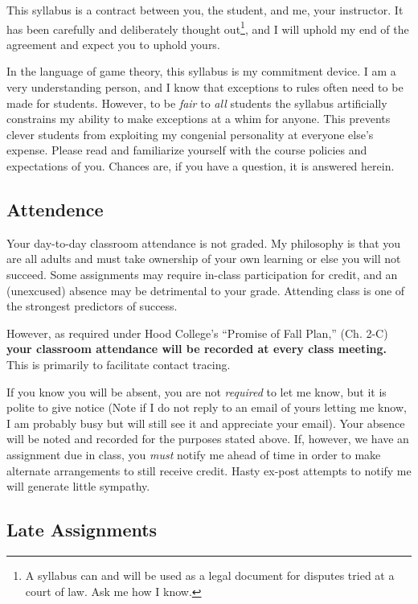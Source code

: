 \documentclass{article}
\begin{document}
This syllabus is a contract between you, the student, and me, your
instructor. It has been carefully and deliberately thought
out\footnote{A syllabus can and will be used as a legal document for
  disputes tried at a court of law. Ask me how I know.}, and I will
uphold my end of the agreement and expect you to uphold yours.

In the language of game theory, this syllabus is my commitment device. I
am a very understanding person, and I know that exceptions to rules
often need to be made for students. However, to be \emph{fair} to
\emph{all} students the syllabus artificially constrains my ability to
make exceptions at a whim for anyone. This prevents clever students from
exploiting my congenial personality at everyone else's expense. Please
read and familiarize yourself with the course policies and expectations
of you. Chances are, if you have a question, it is answered herein.

\hypertarget{attendence}{%
\subsection{Attendence}\label{attendence}}

Your day-to-day classroom attendance is not graded. My philosophy is
that you are all adults and must take ownership of your own learning or
else you will not succeed. Some assignments may require in-class
participation for credit, and an (unexcused) absence may be detrimental
to your grade. Attending class is one of the strongest predictors of
success.

However, as required under Hood College's ``Promise of Fall Plan,'' (Ch.
2-C) \textbf{your classroom attendance will be recorded at every class
meeting.} This is primarily to facilitate contact tracing.

If you know you will be absent, you are not \emph{required} to let me
know, but it is polite to give notice (Note if I do not reply to an
email of yours letting me know, I am probably busy but will still see it
and appreciate your email). Your absence will be noted and recorded for
the purposes stated above. If, however, we have an assignment due in
class, you \emph{must} notify me ahead of time in order to make
alternate arrangements to still receive credit. Hasty ex-post attempts
to notify me will generate little sympathy.

\hypertarget{late-assignments}{%
\subsection{Late Assignments}\label{late-assignments}}
\end{document}
